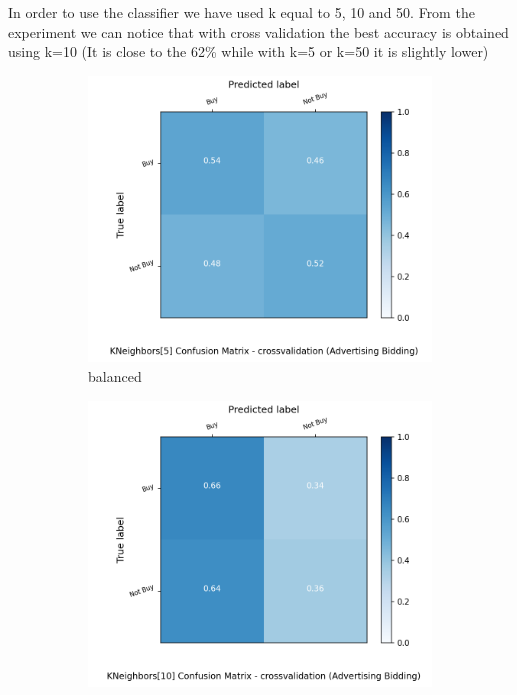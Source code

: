 \documentclass{article}
\begin{document}
In order to use the classifier we have used k equal to 5, 10 and 50.
From the experiment we can notice that with cross validation the best accuracy is obtained using k=10 (It is close to the 62\% while with k=5 or k=50 it is slightly lower)


\begin{figure}[H]
	\centering
	\begin{subfigure}{.5\textwidth}
		\centering
		\includegraphics[width=1.1\textwidth]{Plots/conv_KNeighbors_5_balance_True_crossvalidation}
		\caption{balanced}
	\end{subfigure}%
	\begin{subfigure}{.5\textwidth}
		\centering
		\includegraphics[width=1.1\textwidth]{Plots/conv_KNeighbors_10_balance_True_crossvalidation}

\end{subfigure}
\end{figure}
\end{document}
